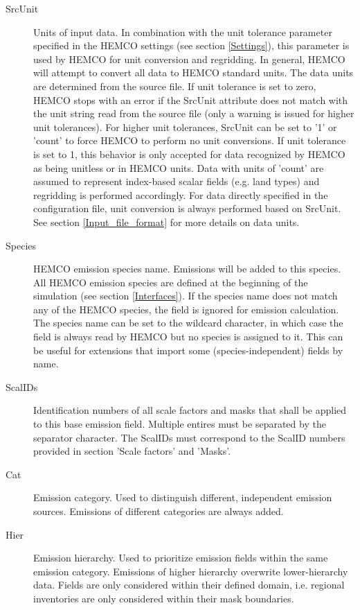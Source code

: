 \documentclass[12pt,a4paper]{article} %
\begin{document}
\begin{description}
\item [SrcUnit] Units of input data. In combination with the unit tolerance parameter specified in the HEMCO settings (see section \ref{Settings}), this parameter is used by HEMCO for unit conversion and regridding. In general, HEMCO will attempt to convert all data to HEMCO standard units. The data units are determined from the source file. If unit tolerance is set to zero, HEMCO stops with an error if the SrcUnit attribute does not match with the unit string read from the source file (only a warning is issued for higher unit tolerances). For higher unit tolerances, SrcUnit can be set to '1' or 'count' to force HEMCO to perform no unit conversions. If unit tolerance is set to 1, this behavior is only accepted for data recognized by HEMCO as being unitless or in HEMCO units. Data with units of 'count' are assumed to represent index-based scalar fields (e.g. land types) and regridding is performed accordingly. For data directly specified in the configuration file, unit conversion is always performed based on SrcUnit. See section \ref{Input_file_format} for more details on data units.
\item [Species] HEMCO emission species name. Emissions will be added to this species. All HEMCO emission species are defined at the beginning of the simulation (see section \ref{Interfaces}). If the species name does not match any of the HEMCO species, the field is ignored for emission calculation. The species name can be set to the wildcard character, in which case the field is always read by HEMCO but no species is assigned to it. This can be useful for extensions that import some (species-independent) fields by name.
\item [ScalIDs] Identification numbers of all scale factors and masks that shall be applied to this base emission field. Multiple entires must be separated by the separator character. The ScalIDs must correspond to the ScalID numbers provided in section 'Scale factors' and 'Masks'.
\item [Cat] Emission category. Used to distinguish different, independent emission sources. Emissions of different categories are always added.
\item [Hier] Emission hierarchy. Used to prioritize emission fields within the same emission category. Emissions of higher hierarchy overwrite lower-hierarchy data. Fields are only considered within their defined domain, i.e. regional inventories are only considered within their mask boundaries.
\end{description}
\end{document}
